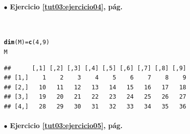\documentclass[10pt,a4paper]{article}\usepackage[]{graphicx}\usepackage[]{color}
\makeatletter
\newcommand{\hlnum}[1]{\textcolor[rgb]{0.686,0.059,0.569}{#1}}%
\newcommand{\hlstd}[1]{\textcolor[rgb]{0.345,0.345,0.345}{#1}}%
\newcommand{\hlkwb}[1]{\textcolor[rgb]{0.69,0.353,0.396}{#1}}%
\newcommand{\hlkwd}[1]{\textcolor[rgb]{0.737,0.353,0.396}{\textbf{#1}}}%
\newenvironment{kframe}{%
 \def\at@end@of@kframe{}%
 \ifinner\ifhmode%
  \def\at@end@of@kframe{\end{minipage}}%
  \begin{minipage}{\columnwidth}%
 \fi\fi%
 \def\FrameCommand##1{\hskip\@totalleftmargin \hskip-\fboxsep
 \colorbox{shadecolor}{##1}\hskip-\fboxsep
     \hskip-\linewidth \hskip-\@totalleftmargin \hskip\columnwidth}%
 \MakeFramed {\advance\hsize-\width
   \@totalleftmargin\z@ \linewidth\hsize
   \@setminipage}}%
 {\par\unskip\endMakeFramed%
 \at@end@of@kframe}
\newenvironment{knitrout}{}{} %
\makeatother
\begin{document}
\paragraph{\bf $\bullet$ Ejercicio \ref{tut03:ejercicio04}, pág. \pageref{tut03:ejercicio04}}
\label{tut03:ejercicio04:sol}\quad\\

\begin{knitrout}
\color{fgcolor}\begin{kframe}
\begin{alltt}
\hlkwd{dim}\hlstd{(M)}\hlkwb{=} \hlkwd{c}\hlstd{(}\hlnum{4}\hlstd{,} \hlnum{9}\hlstd{)}
\hlstd{M}
\end{alltt}
\begin{verbatim}
##      [,1] [,2] [,3] [,4] [,5] [,6] [,7] [,8] [,9]
## [1,]    1    2    3    4    5    6    7    8    9
## [2,]   10   11   12   13   14   15   16   17   18
## [3,]   19   20   21   22   23   24   25   26   27
## [4,]   28   29   30   31   32   33   34   35   36
\end{verbatim}
\end{kframe}
\end{knitrout}

\paragraph{\bf $\bullet$ Ejercicio \ref{tut03:ejercicio05}, pág. \pageref{tut03:ejercicio05}}
\label{tut03:ejercicio05:sol}\quad\\
\end{document}
